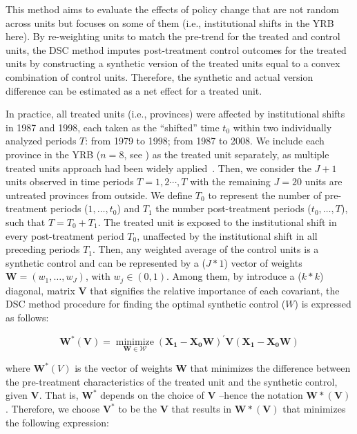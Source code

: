 This method aims to evaluate the effects of policy change that are not random across units but focuses on some of them (i.e., institutional shifts in the YRB here).
By re-weighting units to match the pre-trend for the treated and control units, the DSC method imputes post-treatment control outcomes for the treated units by constructing a synthetic version of the treated units equal to a convex combination of control units.
Therefore, the synthetic and actual version difference can be estimated as a net effect for a treated unit.

In practice, all treated units (i.e., provinces) were affected by institutional shifts in 1987 and 1998, each taken as the ``shifted'' time $t_0$ within two individually analyzed periods $T$: from 1979 to 1998; from 1987 to 2008.
We include each province in the YRB ($n=8$, see \textit{}) as the treated unit separately, as multiple treated units approach had been widely applied~\cite{abadie2021}.
Then, we consider the $J+1$ units observed in time periods $T = {1,2 \cdots , T}$ with the remaining $J=20$ units are untreated provinces from outside.
We define $T_0$ to represent the number of pre-treatment periods ($1,\ldots,t_0$) and $T_1$ the number post-treatment periods ($t_0, \ldots, T$), such that $T = T_0+ T_1$.
The treated unit is exposed to the institutional shift in every post-treatment period $T_0$, unaffected by the institutional shift in all preceding periods $T_1$.
Then, any weighted average of the control units is a synthetic control and can be represented by a ($J * 1$) vector of weights $\mathbf{W} = (w_{1}, \ldots ,w_{J})$, with $w_j \in (0, 1)$.
Among them, by introduce a ($k * k$) diagonal, matrix $\mathbf{V}$ that signifies the relative importance of each covariant, the DSC method procedure for finding the optimal synthetic control ($W$) is expressed as follows:

\begin{equation}
    \mathbf{W^{*}(V)}=\underset{\mathbf{W} \in \mathcal{W}}{\operatorname{minimize}}\left(\mathbf{X}_{\mathbf{1}}-\mathbf{X}_{\mathbf{0}} \mathbf{W}\right)^{\prime} \mathbf{V}\left(\mathbf{X}_{\mathbf{1}}-\mathbf{X}_{\mathbf{0}} \mathbf{W}\right)
\end{equation}

where $\mathbf{W}^{*}(V)$ is the vector of weights $\mathbf{W}$ that minimizes the difference between the pre-treatment characteristics of the treated unit and the synthetic control, given $\mathbf{V}$. That is, $\mathbf{W^{*}}$ depends on the choice of $\mathbf{V}$ –hence the notation $\mathbf{W*(V)}$. Therefore, we choose $\mathbf{V^{*}}$ to be the $\mathbf{V}$ that results in $\mathbf{W*(V)}$ that minimizes the following expression:

